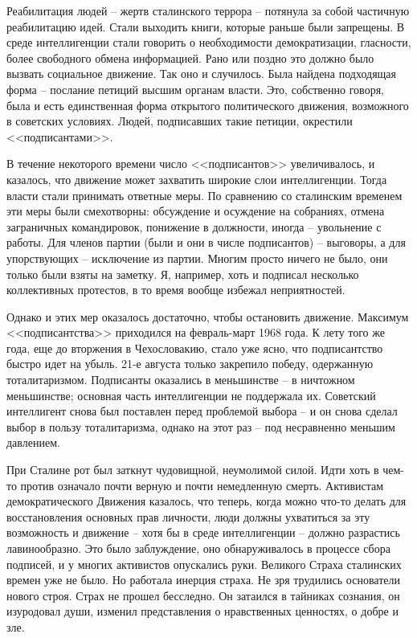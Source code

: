 \documentclass{book}
\begin{document}
Реабилитация людей -- жертв сталинского террора -- потя­нула за собой частичную реабилитацию идей. Стали выходить книги, которые раньше были запрещены. В среде ин\-те\-лли\-ген\-­ции стали говорить о необходимости демократизации, глас­ности, более свободного обмена информацией. Рано или позд­но это должно было вызвать социальное движение. Так оно и случилось. Была найдена подходящая форма -- послание петиций высшим органам власти. Это, собственно говоря, была и есть единственная форма открытого политического движения, возможного в советских условиях. Людей, подписавших такие петиции, окрестили <<подписантами>>.

В течение некоторого времени число <<подписантов>> увели­чивалось, и казалось, что движение может захватить широкие слои интеллигенции. Тогда власти стали принимать ответные меры. По сравнению со сталинским временем эти меры были смехотворны: обсуждение и осуждение на собраниях, отмена заграничных командировок, понижение в должности, иногда -- увольнение с работы. Для членов партии (были и они в числе подписантов) -- выговоры, а для упорствующих -- исключение из партии. Многим просто ничего не было, они только были взяты на заметку. Я, например, хоть и подписал несколько коллективных протестов, в то время вообще избежал непри­ятностей.

Однако и этих мер оказалось достаточно, чтобы остановить движение. Максимум <<подписантства>> приходился на фев­раль-март 1968 года. К лету того же года, еще до вторжения в Чехословакию, стало уже ясно, что подписантство быстро идет на убыль. 21-е августа только закрепило победу, одер­жанную тоталитаризмом. Подписанты оказались в меньшинст­ве -- в ничтожном меньшинстве; основная часть интеллиген­ции не поддержала их. Советский интеллигент снова был по­ставлен перед проблемой выбора -- и он снова сделал выбор в пользу тоталитаризма, однако на этот раз -- под несравненно меньшим давлением.

При Сталине рот был заткнут чудовищной, неумолимой силой. Идти хоть в чем-то против означало почти верную и почти немедленную смерть. Активистам демократического Движения казалось, что теперь, когда можно что-то делать для восстановления основных прав личности, люди должны ухватиться за эту возможность и движение -- хотя бы в среде интеллигенции -- должно разрастись лавинообразно. Это было заблуждение, оно обнаруживалось в процессе сбора под­писей, и у многих активистов опускались руки. Великого Стра­ха сталинских времен уже не было. Но работала инерция стра­ха. Не зря трудились основатели нового строя. Страх не про­шел бесследно. Он затаился в тайниках сознания, он изуродовал души, изменил представления о нравственных ценностях, о добре и зле.
\end{document}
